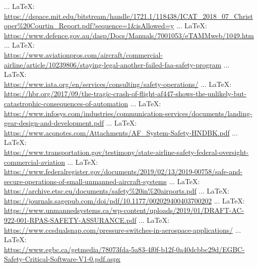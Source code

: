 \begin{thebibliography}{99}
{{{{{{{						 ... \LaTeX:\\ \url{https://dspace.mit.edu/bitstream/handle/1721.1/118438/ICAT_2018_07_Christoper%20Courtin_Report.pdf?sequence=1&isAllowed=y}
						 ... \LaTeX:\\ \url{https://www.defence.gov.au/dasp/Docs/Manuals/7001053/eTAMMweb/1049.htm}
						 ... \LaTeX:\\ \url{https://www.aviationpros.com/aircraft/commercial-airline/article/10239806/staying-legal-another-failed-faa-safety-program}
						 ... \LaTeX:\\ \url{https://www.iata.org/en/services/consulting/safety-operations/}
						 ... \LaTeX:\\ \url{https://hbr.org/2017/09/the-tragic-crash-of-flight-af447-shows-the-unlikely-but-catastrophic-consequences-of-automation}
						 ... \LaTeX:\\ \url{https://www.infosys.com/industries/communication-services/documents/landing-gear-design-and-development.pdf}
						 ... \LaTeX:\\ \url{https://www.acqnotes.com/Attachments/AF_System-Safety-HNDBK.pdf}
						 ... \LaTeX:\\ \url{https://www.transportation.gov/testimony/state-airline-safety-federal-oversight-commercial-aviation}
						 ... \LaTeX:\\ \url{https://www.federalregister.gov/documents/2019/02/13/2019-00758/safe-and-secure-operations-of-small-unmanned-aircraft-systems}
						 ... \LaTeX:\\ \url{https://archive.etsc.eu/documents/safety%20in%20airports.pdf}
						 ... \LaTeX:\\ \url{https://journals.sagepub.com/doi/pdf/10.1177/002029400403700202}
						 ... \LaTeX:\\ \url{https://www.unmannedsystems.ca/wp-content/uploads/2019/01/DRAFT-AC-922-001-RPAS-SAFETY-ASSURANCE.pdf}
						 ... \LaTeX:\\ \url{https://www.ccsdualsnap.com/pressure-switches-in-aerospace-applications/}
						 ... \LaTeX:\\ \url{https://www.egbc.ca/getmedia/78073fda-5a83-4f0f-b12f-0a40dcbbc29d/EGBC-Safety-Critical-Software-V1-0.pdf.aspx}
}}}}}}}
\end{thebibliography}
